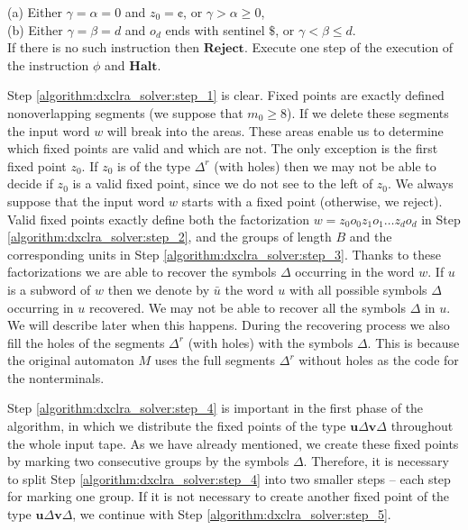 \begin{algorithm}
\nonl (a) Either $\gamma = \alpha = 0$ and $z_0 = \cent$, or $\gamma > \alpha \ge 0$,\\
\nonl (b) Either $\gamma = \beta = d$ and $o_d$ ends with sentinel $\$$, or $\gamma < \beta \le d$.\\
\nonl If there is no such instruction then $\textbf{Reject}$.\label{algorithm:dxclra_solver:step_7}\;
Execute one step of the execution of the instruction $\phi$ and $\textbf{Halt}$.\label{algorithm:dxclra_solver:step_8}\;
\end{algorithm}

Step \ref{algorithm:dxclra_solver:step_1} is clear. Fixed points are exactly defined nonoverlapping segments (we suppose that $m_0 \ge 8$). If we delete these segments the input word $w$ will break into the areas. These areas enable us to determine which fixed points are valid and which are not. The only exception is the first fixed point $z_0$. If $z_0$ is of the type $\Delta^r$ (with holes) then we may not be able to decide if $z_0$ is a valid fixed point, since we do not see to the left of $z_0$. We always suppose that the input word $w$ starts with a fixed point (otherwise, we reject). Valid fixed points exactly define both the factorization $w = z_0 o_0 z_1 o_1 \ldots z_d o_d$ in Step \ref{algorithm:dxclra_solver:step_2}, and the groups of length $B$ and the corresponding units in Step \ref{algorithm:dxclra_solver:step_3}. Thanks to these factorizations we are able to recover the symbols $\Delta$ occurring in the word $w$. If $u$ is a subword of $w$ then we denote by $\bar{u}$ the word $u$ with all possible symbols $\Delta$ occurring in $u$ recovered. We may not be able to recover all the symbols $\Delta$ in $u$. We will describe later when this happens. During the recovering process we also fill the holes of the segments $\Delta^r$ (with holes) with the symbols $\Delta$. This is because the original automaton $M$ uses the full segments $\Delta^r$ without holes as the code for the nonterminals.

Step \ref{algorithm:dxclra_solver:step_4} is important in the first phase of the algorithm, in which we distribute the fixed points of the type $\mathbf{u} \Delta \mathbf{v} \Delta$ throughout the whole input tape. As we have already mentioned, we create these fixed points by marking two consecutive groups by the symbols $\Delta$. Therefore, it is necessary to split Step \ref{algorithm:dxclra_solver:step_4} into two smaller steps -- each step for marking one group. If it is not necessary to create another fixed point of the type $\mathbf{u} \Delta \mathbf{v} \Delta$, we continue with Step \ref{algorithm:dxclra_solver:step_5}.

